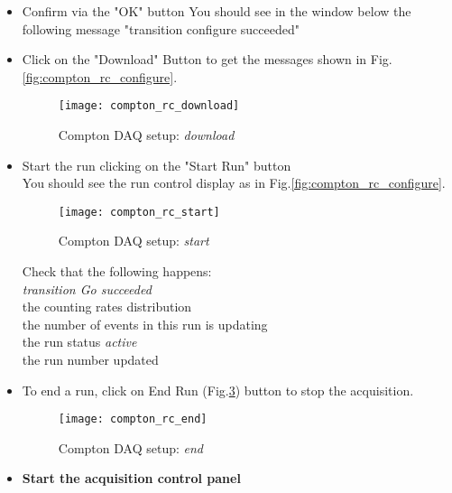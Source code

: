 {\begin{itemize}
\item Confirm via the "OK" button
You should see in the window below the following message "transition
configure succeeded"
\item Click on the "Download" Button to get the  messages shown in 
Fig.\ref{fig:compton_rc_configure}. \\
\begin{figure}[htp]
    \begin{center}
        \texttt{[image: compton\_rc\_download]}
    \end{center}
    \caption[compton:runcontrol download]{Compton DAQ setup: {\it download} }
    \label{fig:compton_rc_download}
\end{figure}
\item Start the run clicking on the "Start Run" button\\
You should see the run control display as in 
Fig.\ref{fig:compton_rc_configure}. \\
\begin{figure}[htp]
    \begin{center}
        \texttt{[image: compton\_rc\_start]}
    \end{center}
    \caption[compton:runcontrol start run]{Compton DAQ setup: {\it start} }
    \label{fig:compton_rc_start}
\end{figure}
Check that the following happens:\\
{\it transition Go succeeded}\\
the counting rates distribution\\
the number of events in this run is updating\\
the run status {\it active}\\
the run number updated\\

\item To end a run, click on End Run (Fig.\ref{fig:compton_rc_end}) button to stop the acquisition.
\begin{figure}[htp]
    \begin{center}
        \texttt{[image: compton\_rc\_end]}
    \end{center}
    \caption[compton:runcontrol end run]{Compton DAQ setup: {\it end} }
    \label{fig:compton_rc_end}
\end{figure}

\newpage
\item {\bf Start the acquisition control panel}\\


\end{itemize}}
